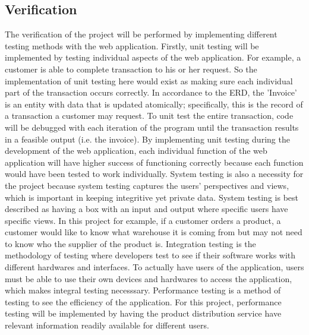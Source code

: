 \documentclass[12pt]{article}
\begin{document}
\begin{myspace}{1.7}
\section*{Verification}
	The verification of the project will be performed by implementing different testing methods \cite {testmethod} with the web application. Firstly, unit testing will be implemented by testing individual aspects of the web application. For example, a customer is able to complete transaction to his or her request. So the implementation of unit testing here would exist as making sure each individual part of the transaction occurs correctly. In accordance to the ERD, the 'Invoice' is an entity with data that is updated atomically; specifically, this is the record of a transaction a customer may request. To unit test the entire transaction, code will be debugged with each iteration of the program until the transaction results in a feasible output (i.e. the invoice). By implementing unit testing during the development of the web application, each individual function of the web application will have higher success of functioning correctly because each function would have been tested to work individually.
	System testing is also a necessity for the project because system testing captures the users' perspectives and views, which is important in keeping integritive yet private data. System testing is best described as having a box with an input and output where specific users have specific views. In this project for example, if a customer orders a product, a customer would like to know what warehouse it is coming from but may not need to know who the supplier of the product is.
	Integration testing is the methodology of testing where developers test to see if their software works with different hardwares and interfaces. To actually have users of the application, users must be able to use their own devices and hardwares to access the application, which makes integral testing necesssary.
	Performance testing is a method of testing to see the efficiency of the application. For this project, performance testing will be implemented by having the product distribution service have relevant information readily available for different users.





%
%
\pagebreak

\end{myspace}
\end{document}
